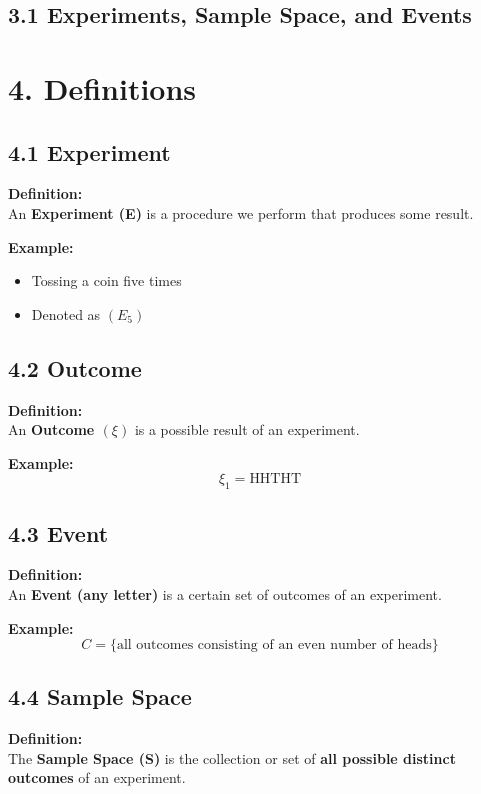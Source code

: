 \documentclass[12pt]{article}
\begin{document}
\subsection*{3.1 Experiments, Sample Space, and Events}

\section*{4. Definitions}

\subsection*{4.1 Experiment}

\textbf{Definition:}\\
An \textbf{Experiment (E)} is a procedure we perform that produces some result.

\textbf{Example:}
\begin{itemize}
  \item Tossing a coin five times
  \item Denoted as $( E_5 )$
\end{itemize}

\subsection*{4.2 Outcome}

\textbf{Definition:}\\
An \textbf{Outcome $(\xi)$} is a possible result of an experiment.

\textbf{Example:}
\[
\xi_1 = \text{HHTHT}
\]

\subsection*{4.3 Event}

\textbf{Definition:}\\
An \textbf{Event (any letter)} is a certain set of outcomes of an experiment.

\textbf{Example:}
\[
C = \{\text{all outcomes consisting of an even number of heads}\}
\]

\subsection*{4.4 Sample Space}

\textbf{Definition:}\\
The \textbf{Sample Space (S)} is the collection or set of \textbf{all possible distinct outcomes} of an experiment.
\end{document}
